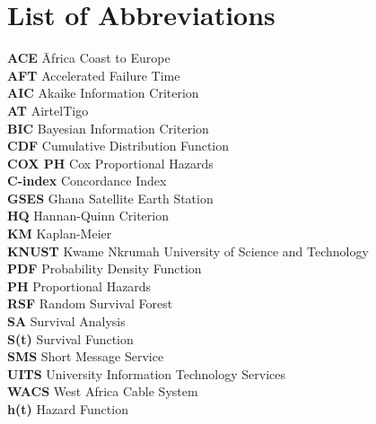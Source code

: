 \documentclass[doublespacing,12pt]{report}
\begin{document}
\newpage
\chapter*{List of Abbreviations}

\begin{tabbing}
    \textbf{ACE} \hspace{2cm} \= Africa Coast to Europe \\
    \textbf{AFT} \> Accelerated Failure Time \\
    \textbf{AIC} \> Akaike Information Criterion \\
    \textbf{AT} \> AirtelTigo \\
    \textbf{BIC} \> Bayesian Information Criterion \\
    \textbf{CDF} \> Cumulative Distribution Function \\
    \textbf{COX PH} \> Cox Proportional Hazards \\
    \textbf{C-index} \> Concordance Index \\
    \textbf{GSES} \> Ghana Satellite Earth Station \\
    \textbf{HQ} \> Hannan-Quinn Criterion \\
    \textbf{KM} \> Kaplan-Meier \\
    \textbf{KNUST} \> Kwame Nkrumah University of Science and Technology \\
    \textbf{PDF} \> Probability Density Function \\
    \textbf{PH} \> Proportional Hazards \\
    \textbf{RSF} \> Random Survival Forest \\
    \textbf{SA} \> Survival Analysis \\
    \textbf{S(t)} \> Survival Function \\
    \textbf{SMS} \> Short Message Service \\
    \textbf{UITS} \> University Information Technology Services \\
    \textbf{WACS} \> West Africa Cable System \\
    \textbf{h(t)} \> Hazard Function \\
\end{tabbing}



\newpage
\renewcommand{\contentsname}{Table of Content} %
\tableofcontents %


\newpage
\listoffigures
\end{document}
